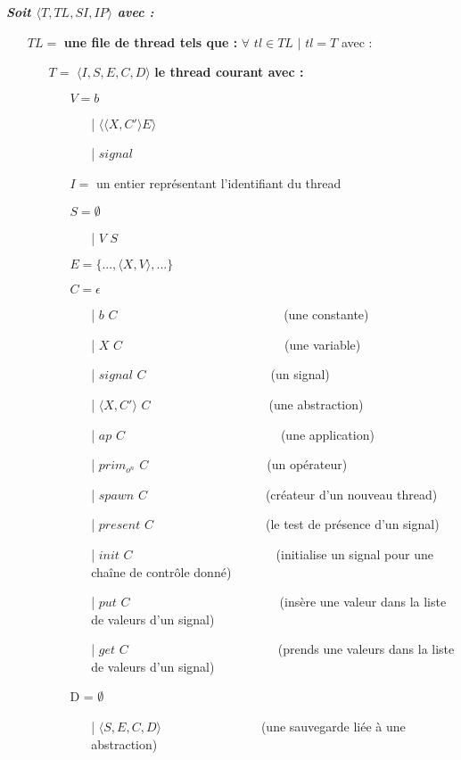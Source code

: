 \documentclass[10pt,a4paper]{article}
\begin{document}
		\textbf{\textit{Soit $\langle T,TL,SI,IP\rangle$ avec :}}
		
		\begin{itemize}
			\item[] $TL =$ \textbf{une file de thread tels que :} $\forall$ $tl \in TL$ $|$ $tl = T$ avec :
			\begin{itemize}
			  \item[] $T =$ $\langle I,S,E,C,D\rangle$ \textbf{le thread courant avec :}
			  \begin{itemize}
			  	\item[] $V = b$	
			  	\begin{itemize}
			  		\item[|] $\langle\langle X,C' \rangle E\rangle$
			  		\item[|] $signal$
			  	\end{itemize}
			  	\item[] $I =$ un entier représentant l'identifiant du thread
			  	\item[] $S =  \emptyset$ 
			  	\begin{itemize}
			  		\item[|] $V$ $S$
			  	\end{itemize}
			  	\item[] $E = \{...,\langle X,V\rangle,...\}$
			  	\item[] $C = \epsilon$
			  	\begin{itemize}
			  		\item[|] $b$ $C$~~~~~~~~~~~~~~~~~~~~~~~~~~    (une constante)
			  		\item[|] $X$ $C$~~~~~~~~~~~~~~~~~~~~~~~~~~(une variable)
			  		\item[|] $signal$ $C$~~~~~~~~~~~~~~~~~~~~(un signal)
			  		\item[|] $\langle X,C'\rangle$ $C$~~~~~~~~~~~~~~~~~~~(une abstraction)
			  		\item[|] $ap$ $C$~~~~~~~~~~~~~~~~~~~~~~~~~(une application)
			  		\item[|] $prim_{o^{n}}$ $C$~~~~~~~~~~~~~~~~~~~(un opérateur)
			  		\item[|] $spawn$ $C$~~~~~~~~~~~~~~~~~~~(créateur d'un nouveau thread)
			  		\item[|] $present$ $C$~~~~~~~~~~~~~~~~~~(le test de présence d'un signal)
			  		\item[|] $init$ $C$~~~~~~~~~~~~~~~~~~~~~~~(initialise un signal pour une chaîne de contrôle donné)
			  		\item[|] $put$ $C$~~~~~~~~~~~~~~~~~~~~~~~~(insère une valeur dans la liste de valeurs d'un signal)
			  		\item[|] $get$ $C$~~~~~~~~~~~~~~~~~~~~~~~~(prends une valeurs dans la liste de valeurs d'un signal)
			  	\end{itemize}
			  	\item[] D = $\emptyset$
			  	\begin{itemize}
			  		\item[|] $\langle S,E,C,D\rangle$~~~~~~~~~~~~~~~~(une sauvegarde liée à une abstraction)
			  	\end{itemize}
			  \end{itemize}	
			\end{itemize}
			

\end{itemize}
\end{document}
